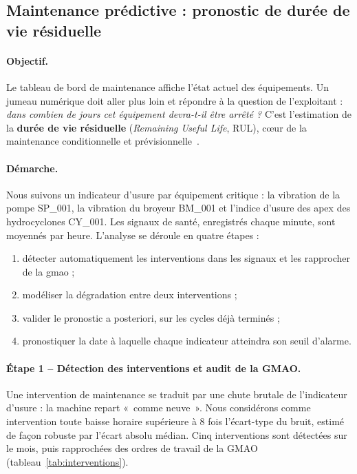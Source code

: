 \subsection{Maintenance prédictive : pronostic de durée de vie résiduelle}
\label{sec:pronostic}

\paragraph{Objectif.} Le tableau de bord de maintenance affiche l'état actuel des équipements. Un jumeau numérique doit aller plus loin et répondre à la question de l'exploitant : \textit{dans combien de jours cet équipement devra-t-il être arrêté ?} C'est l'estimation de la \textbf{durée de vie résiduelle} (\textit{Remaining Useful Life}, RUL), cœur de la maintenance conditionnelle et prévisionnelle~\cite{jardine2006}.

\paragraph{Démarche.} Nous suivons un indicateur d'usure par équipement critique : la vibration de la pompe SP\_001, la vibration du broyeur BM\_001 et l'indice d'usure des apex des hydrocyclones CY\_001. Les signaux de santé, enregistrés chaque minute, sont moyennés par heure. L'analyse se déroule en quatre étapes :
\begin{enumerate}
  \item détecter automatiquement les interventions dans les signaux et les rapprocher de la \gls{gmao} ;
  \item modéliser la dégradation entre deux interventions ;
  \item valider le pronostic a posteriori, sur les cycles déjà terminés ;
  \item pronostiquer la date à laquelle chaque indicateur atteindra son seuil d'alarme.
\end{enumerate}

\paragraph{Étape 1 -- Détection des interventions et audit de la GMAO.} Une intervention de maintenance se traduit par une chute brutale de l'indicateur d'usure : la machine repart «~comme neuve~». Nous considérons comme intervention toute baisse horaire supérieure à 8 fois l'écart-type du bruit, estimé de façon robuste par l'écart absolu médian. Cinq interventions sont détectées sur le mois, puis rapprochées des ordres de travail de la GMAO (tableau~\ref{tab:interventions}).

